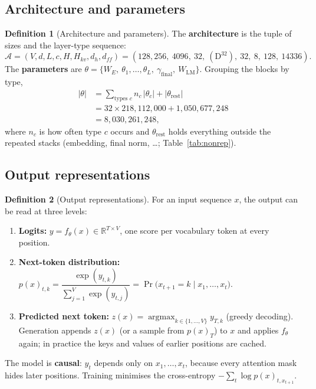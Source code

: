 \documentclass[10pt,a4paper]{article}
\theoremstyle{definition}
\newtheorem{definition}{Definition}[section]
\begin{document}
\subsection{Architecture and parameters}
\begin{definition}[Architecture and parameters]
The \textbf{architecture} is the tuple of sizes and the layer-type sequence:
\begin{equation}
  \mathcal{A} = (V,d,L,c,H,H_{kv},d_h,d_{ff}) = (128{,}256,\ 4096,\ 32,\ (\mathrm{D}^{32}),\ 32,\ 8,\ 128,\ 14336).
\end{equation}
The \textbf{parameters} are $\theta=\{W_E,\ \theta_1,\dots,\theta_L,\ \gamma_{\mathrm{final}},\ W_{\mathrm{LM}}\}$. Grouping the blocks by type,
\begin{align*}
  |\theta| &= \sum_{\text{types } c} n_c\,|\theta_c| + |\theta_{\mathrm{rest}}| \\
  &= 32\times218{,}112{,}000 + 1{,}050{,}677{,}248 \\
  &= 8{,}030{,}261{,}248,
\end{align*}
where $n_c$ is how often type $c$ occurs and $\theta_{\mathrm{rest}}$ holds everything outside the repeated stacks (embedding, final norm, \dots; Table~\ref{tab:nonrep}).
\end{definition}
\subsection{Output representations}
\begin{definition}[Output representations]
For an input sequence $x$, the output can be read at three levels:
\begin{enumerate}
\item \textbf{Logits:} $y=f_\theta(x)\in\mathbb{R}^{T\times V}$, one score per vocabulary token at every position.
\item \textbf{Next-token distribution:} $p(x)_{t,k}=\dfrac{\exp(y_{t,k})}{\sum_{j=1}^{V}\exp(y_{t,j})}=\Pr\big(x_{t+1}=k\mid x_{1},\dots,x_{t}\big)$.
\item \textbf{Predicted next token:} $z(x)=\operatorname{argmax}_{k\in\{1,\dots,V\}} y_{T,k}$ (greedy decoding). Generation appends $z(x)$ (or a sample from $p(x)_{T}$) to $x$ and applies $f_\theta$ again; in practice the keys and values of earlier positions are cached.
\end{enumerate}
The model is \textbf{causal}: $y_t$ depends only on $x_1,\dots,x_t$, because every attention mask hides later positions. Training minimises the cross-entropy $-\sum_{t}\log p(x)_{t,x_{t+1}}$.
\end{definition}
\end{document}
